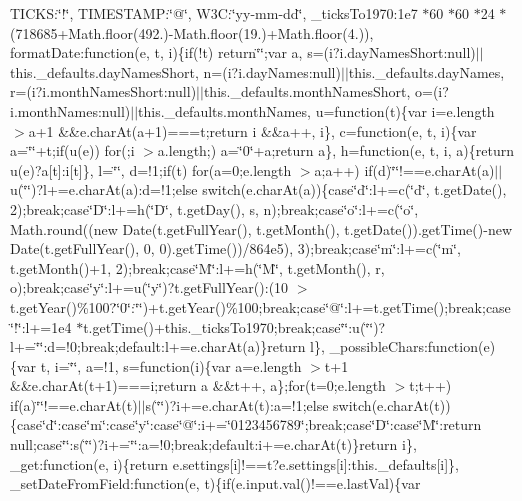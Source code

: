 \begin{DoxyCompactItemize}
T\+I\+C\+K\+S\+:\char`\"{}!\char`\"{}, T\+I\+M\+E\+S\+T\+A\+M\+P\+:\char`\"{}@\char`\"{}, W3\+C\+:\char`\"{}yy-\/mm-\/dd\char`\"{}, \+\_\+ticks\+To1970\+:1e7 $\ast$60 $\ast$60 $\ast$24 $\ast$(718685+\+Math.\+floor(492.)-\/\+Math.\+floor(19.)+\+Math.\+floor(4.)), format\+Date\+:function(e, t, i)\{if(!t) return\char`\"{}\char`\"{};var a, s=(i?i.\+day\+Names\+Short\+:null)$\vert$$\vert$this.\+\_\+defaults.\+day\+Names\+Short, n=(i?i.\+day\+Names\+:null)$\vert$$\vert$this.\+\_\+defaults.\+day\+Names, r=(i?i.\+month\+Names\+Short\+:null)$\vert$$\vert$this.\+\_\+defaults.\+month\+Names\+Short, o=(i?i.\+month\+Names\+:null)$\vert$$\vert$this.\+\_\+defaults.\+month\+Names, u=function(t)\{var i=e.\+length $>$a+1 \&\&e.\+char\+At(a+1)===t;return i \&\&a++, i\}, c=function(e, t, i)\{var a=\char`\"{}\char`\"{}+t;if(u(e)) for(;i $>$a.\+length;) a=\char`\"{}0\char`\"{}+a;return a\}, h=function(e, t, i, a)\{return u(e)?a\mbox{[}t\mbox{]}\+:i\mbox{[}t\mbox{]}\}, l=\char`\"{}\char`\"{}, d=!1;if(t) for(a=0;e.\+length $>$a;a++) if(d)\char`\"{}\textquotesingle{}\char`\"{}!==e.\+char\+At(a)$\vert$$\vert$u(\char`\"{}\textquotesingle{}\char`\"{})?l+=e.\+char\+At(a)\+:d=!1;else switch(e.\+char\+At(a))\{case\char`\"{}d\char`\"{}\+:l+=c(\char`\"{}d\char`\"{}, t.\+get\+Date(), 2);break;case\char`\"{}\+D\char`\"{}\+:l+=h(\char`\"{}\+D\char`\"{}, t.\+get\+Day(), s, n);break;case\char`\"{}o\char`\"{}\+:l+=c(\char`\"{}o\char`\"{}, Math.\+round((new Date(t.\+get\+Full\+Year(), t.\+get\+Month(), t.\+get\+Date()).\+get\+Time()-\/new Date(t.\+get\+Full\+Year(), 0, 0).\+get\+Time())/864e5), 3);break;case\char`\"{}m\char`\"{}\+:l+=c(\char`\"{}m\char`\"{}, t.\+get\+Month()+1, 2);break;case\char`\"{}\+M\char`\"{}\+:l+=h(\char`\"{}\+M\char`\"{}, t.\+get\+Month(), r, o);break;case\char`\"{}y\char`\"{}\+:l+=u(\char`\"{}y\char`\"{})?t.\+get\+Full\+Year()\+:(10 $>$t.\+get\+Year()\%100?\char`\"{}0\char`\"{}\+:\char`\"{}\char`\"{})+t.\+get\+Year()\%100;break;case\char`\"{}@\char`\"{}\+:l+=t.\+get\+Time();break;case\char`\"{}!\char`\"{}\+:l+=1e4 $\ast$t.\+get\+Time()+this.\+\_\+ticks\+To1970;break;case\char`\"{}\textquotesingle{}\char`\"{}\+:u(\char`\"{}\textquotesingle{}\char`\"{})?l+=\char`\"{}\textquotesingle{}\char`\"{}\+:d=!0;break;default\+:l+=e.\+char\+At(a)\}return l\}, \+\_\+possible\+Chars\+:function(e)\{var t, i=\char`\"{}\char`\"{}, a=!1, s=function(i)\{var a=e.\+length $>$t+1 \&\&e.\+char\+At(t+1)===i;return a \&\&t++, a\};for(t=0;e.\+length $>$t;t++) if(a)\char`\"{}\textquotesingle{}\char`\"{}!==e.\+char\+At(t)$\vert$$\vert$s(\char`\"{}\textquotesingle{}\char`\"{})?i+=e.\+char\+At(t)\+:a=!1;else switch(e.\+char\+At(t))\{case\char`\"{}d\char`\"{}\+:case\char`\"{}m\char`\"{}\+:case\char`\"{}y\char`\"{}\+:case\char`\"{}@\char`\"{}\+:i+=\char`\"{}0123456789\char`\"{};break;case\char`\"{}\+D\char`\"{}\+:case\char`\"{}\+M\char`\"{}\+:return null;case\char`\"{}\textquotesingle{}\char`\"{}\+:s(\char`\"{}\textquotesingle{}\char`\"{})?i+=\char`\"{}\textquotesingle{}\char`\"{}\+:a=!0;break;default\+:i+=e.\+char\+At(t)\}return i\}, \+\_\+get\+:function(e, i)\{return e.\+settings\mbox{[}i\mbox{]}!==t?e.\+settings\mbox{[}i\mbox{]}\+:this.\+\_\+defaults\mbox{[}i\mbox{]}\}, \+\_\+set\+Date\+From\+Field\+:function(e, t)\{if(e.\+input.\+val()!==e.\+last\+Val)\{var 
\end{DoxyCompactItemize}
